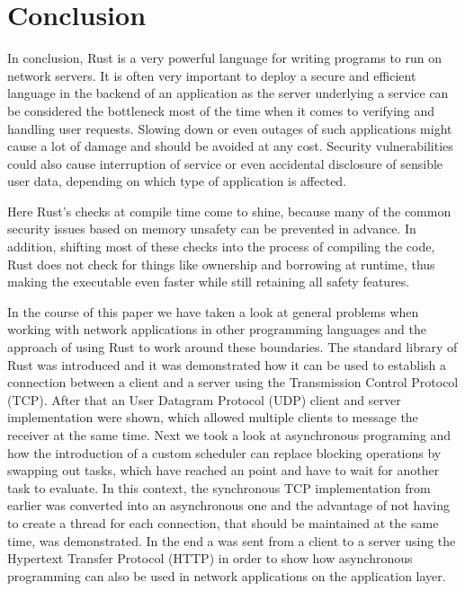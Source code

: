 
\section{Conclusion}
In conclusion, Rust is a very powerful language for writing programs to run on network servers. It is often very
important to deploy a secure and efficient language in the backend of an application as the server underlying a service
can be considered the bottleneck most of the time when it comes to verifying and handling user requests. Slowing down
or even outages of such applications might cause a lot of damage and should be avoided at any cost. Security
vulnerabilities could also cause interruption of service or even accidental disclosure of sensible user data, depending
on which type of application is affected.

Here Rust's checks at compile time come to shine, because many of the common security issues based on memory unsafety
can be prevented in advance. In addition, shifting most of these checks into the process of compiling the code, Rust
does not check for things like ownership and borrowing at runtime, thus making the executable even faster while still
retaining all safety features.

In the course of this paper we have taken a look at general problems when working with network applications in other
programming languages and the approach of using Rust to work around these boundaries. The standard library of Rust was
introduced and it was demonstrated how it can be used to establish a connection between a client and a server using the
Transmission Control Protocol (TCP). After that an User Datagram Protocol (UDP) client and server implementation were
shown, which allowed multiple clients to message the receiver at the same time. Next we took a look at asynchronous
programing and how the introduction of a custom scheduler can replace blocking operations by swapping out tasks, which
have reached an  point and have to wait for another task to evaluate. In this context, the synchronous TCP
implementation from earlier was converted into an asynchronous one and the advantage of not having to create a thread
for each connection, that should be maintained at the same time, was demonstrated. In the end a  was sent
from a client to a server using the Hypertext Transfer Protocol (HTTP) in order to show how asynchronous programming
can also be used in network applications on the application layer.

